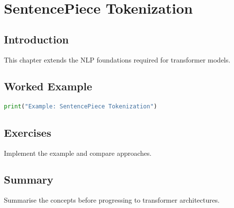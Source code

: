 \chapter{SentencePiece Tokenization}
\label{chap:vol8-8}



\section{Introduction}
This chapter extends the NLP foundations required for transformer models.

\section{Worked Example}
\begin{lstlisting}[language=Python]
print("Example: SentencePiece Tokenization")
\end{lstlisting}

\section{Exercises}
\begin{exercise}
Implement the example and compare approaches.
\end{exercise}

\section{Summary}
Summarise the concepts before progressing to transformer architectures.
